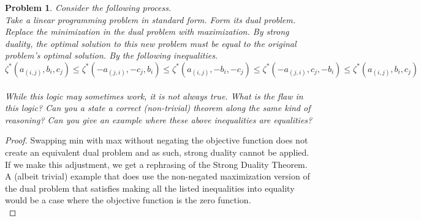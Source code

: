 \documentclass[12pt,oneside]{amsart}
\numberwithin{equation}{section}
\numberwithin{figure}{section}
\theoremstyle{plain}
\newtheorem{prob}{Problem}
\theoremstyle{definition}
\begin{document}
\begin{prob}
Consider the following process. \\
Take a linear programming problem in standard 
form. Form its dual problem. Replace the minimization in the dual problem with 
maximization. By strong duality, the optimal solution to this new problem must 
be equal to the original problem's optimal solution. By the following inequalities. \\
\[\zeta^*(a_{(i,j)},b_i,c_j) \leq \zeta^*(-a_{(j,i)},-c_j,b_i) \leq \zeta^*(
a_{(i,j)},-b_i,-c_j) \leq \zeta^*(-a_{(j,i)},c_j,-b_i) \leq \zeta^*(a_{(i,j)},
b_i,c_j)\] \\
While this logic may sometimes work, it is not always true. What is the flaw in 
this logic? Can you a state a correct (non-trivial) theorem along the same kind 
of reasoning? Can you give an example where these above inequalities are equalities?
\end{prob}
\begin{proof}
Swapping min with max without negating the objective function does not create an 
equivalent dual problem and as such, strong duality cannot be applied. If we 
make this adjustment, we get a rephrasing of the Strong Duality Theorem. A (albeit 
trivial) example that does use the non-negated maximization version of the dual 
problem that satisfies making all the listed inequalities into equality would be 
a case where the objective function is the zero function. \\
\end{proof}
\end{document}
